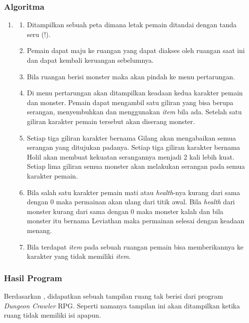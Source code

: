 \documentclass[../main.tex]{subfiles}
\begin{document}
\subsubsection{Algoritma}
\begin{enumerate}
    \item[]
    \begin{enumerate}
        \item {Ditampilkan sebuah peta dimana letak pemain ditandai dengan tanda seru (!).}
        \item {Pemain dapat maju ke ruangan yang dapat diakses oleh ruangan saat ini dan dapat kembali keruangan sebelumnya.}
        \item {Bila ruangan berisi monster maka akan pindah ke menu pertarungan.}
        \item {Di menu pertarungan akan ditampilkan keadaan kedua karakter pemain dan monster. Pemain dapat mengambil satu giliran yang bisa berupa serangan, menyembuhkan dan menggunakan \textit{item} bila ada. Setelah satu giliran karakter pemain tersebut akan diserang monster.}
        \item {Setiap tiga giliran karakter bernama Gilang akan mengabaikan semua serangan yang ditujukan padanya. Setiap tiga giliran karakter bernama Holil akan membuat kekuatan serangannya menjadi 2 kali lebih kuat. Setiap lima giliran semua monster akan melakukan serangan pada semua karakter pemain.}
        \item {Bila salah satu karakter pemain mati atau \textit{health}-nya kurang dari sama dengan 0 maka permainan akan ulang dari titik awal. Bila \textit{health} dari monster kurang dari sama dengan 0 maka monster kalah dan bila monster itu bernama Leviathan maka permainan selesai dengan keadaan menang.}
        \item {Bila terdapat \textit{item} pada sebuah ruangan pemain bisa memberikannya ke karakter yang tidak memiliki \textit{item}.}
    \end{enumerate}
\end{enumerate}

\newpage
\subsubsectionf{\Flowchart}
\vspace{0.65ex}

\subsubsectionf{{\Source} {\sCode}}
\vspace{-1ex}

\subsubsection{Hasil Program}
\begin{indentpar}
    \hspace{\parindent}Berdasarkan , didapatkan sebuah tampilan ruang tak berisi dari program \textit{Dungeon Crawler} RPG. Seperti namanya tampilan ini akan ditampilkan ketika ruang tidak memiliki isi apapun.
\end{indentpar}
\end{document}
